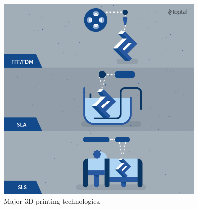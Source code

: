 \documentclass[10pt,letterpaper]{book}
\begin{document}
 	\begin{figure}[H]
		\includegraphics[width=0.9\textwidth]{imgs/3dp_fdm_sla_sls.jpeg}
		\caption{Major 3D printing technologies.}
	\end{figure}
 	
\end{document}
